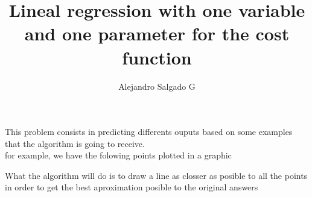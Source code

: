 \documentclass[12pt,journal]{IEEEtran}
\begin{document}
    \title{Lineal regression with one variable and one parameter for the cost
           function}
    \author{Alejandro Salgado G}
    \maketitle

    This problem consists in predicting differents ouputs based on some examples
    that the algorithm is going to receive. \\

    for example, we have the folowing points plotted in a graphic\\


    What the algorithm will do is to draw a line as closser as posible to all
    the points in order to get the best aproximation posible to the original
    answers\\

\end{document}
